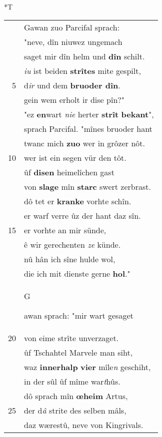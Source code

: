 \documentclass[8pt,a4paper,notitlepage]{article}
\begin{document}
\begin{table}[ht]
\begin{minipage}[t]{0.5\linewidth}
\end{minipage}
\hspace{0.5cm}
\begin{minipage}[t]{0.5\linewidth}
\small
\begin{center}*T
\end{center}
\begin{tabular}{rl}
 & Gawan zuo Parcifal sprach:\\ 
 & "neve, dîn niuwez ungemach\\ 
 & saget mir dîn helm und \textbf{dîn} schilt.\\ 
 & \textit{iu} ist beiden \textbf{strîtes} mite gespilt,\\ 
5 & d\textit{ir} und dem \textbf{bruoder dîn}.\\ 
 & gein wem erholt ir dise pîn?"\\ 
 & "ez \textbf{en}wart \textit{nie} herter \textbf{strît} \textbf{bekant}",\\ 
 & sprach Parcifal. "mînes bruoder hant\\ 
 & twanc mich \textbf{zuo} wer in grôzer nôt.\\ 
10 & wer ist ein segen vür den tôt.\\ 
 & ûf \textbf{disen} heimelîchen gast\\ 
 & von \textbf{slage} mîn \textbf{starc} swert zerbrast.\\ 
 & dô tet er \textbf{kranke} vorhte schîn.\\ 
 & er warf verre ûz der hant daz sîn.\\ 
15 & er vorhte an mir sünde,\\ 
 & ê wir gerechenten \textit{ze} künde.\\ 
 & nû hân ich sîne hulde wol,\\ 
 & die ich mit dienste gerne \textbf{hol}."\\ 
 & \begin{large}G\end{large}awan sprach: "mir wart gesaget\\ 
20 & von eime strîte unverzaget.\\ 
 & ûf Tschahtel Marvele man siht,\\ 
 & waz \textbf{innerhalp} \textbf{vier} mîle\textit{n} geschiht,\\ 
 & in der sûl ûf mîme war\textit{t}hûs.\\ 
 & dô sprach mîn \textbf{œheim} Artus,\\ 
25 & der d\textit{â} strite des selben mâls,\\ 
 & daz wærestû, neve von Kingrivals.\\ 

\end{tabular}
\end{minipage}
\end{table}
\end{document}
